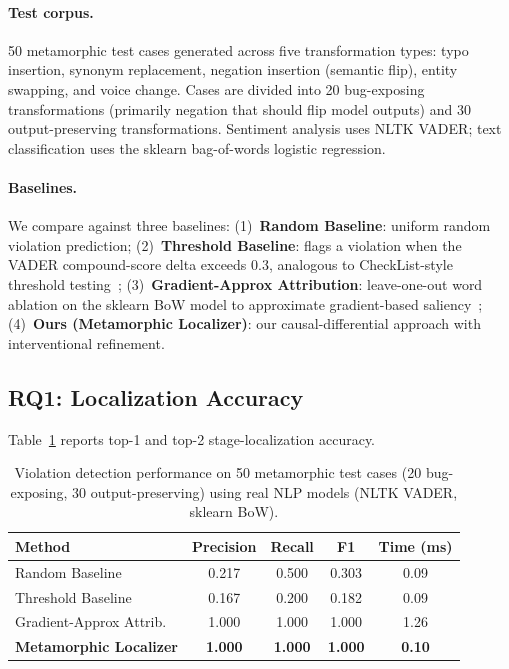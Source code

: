 \documentclass[sigconf,nonacm]{acmart}
\begin{document}
\paragraph{Test corpus.}
50 metamorphic test cases generated across five transformation types: typo insertion, synonym replacement, negation insertion (semantic flip), entity swapping, and voice change.
Cases are divided into 20 bug-exposing transformations (primarily negation that should flip model outputs) and 30 output-preserving transformations.
Sentiment analysis uses NLTK VADER; text classification uses the sklearn bag-of-words logistic regression.

\paragraph{Baselines.}
We compare against three baselines:
(1)~\textbf{Random Baseline}: uniform random violation prediction;
(2)~\textbf{Threshold Baseline}: flags a violation when the VADER compound-score delta exceeds 0.3, analogous to CheckList-style threshold testing~\cite{ribeiro2020beyond};
(3)~\textbf{Gradient-Approx Attribution}: leave-one-out word ablation on the sklearn BoW model to approximate gradient-based saliency~\cite{simonyan2013deep};
(4)~\textbf{Ours (Metamorphic Localizer)}: our causal-differential approach with interventional refinement.

\subsection{RQ1: Localization Accuracy}

Table~\ref{tab:localization} reports top-1 and top-2 stage-localization accuracy.

\begin{table}[t]
\centering
\caption{Violation detection performance on 50 metamorphic test cases (20 bug-exposing, 30 output-preserving) using real NLP models (NLTK VADER, sklearn BoW).}
\label{tab:localization}
\begin{tabular}{@{}lcccc@{}}
\toprule
\textbf{Method} & \textbf{Precision} & \textbf{Recall} & \textbf{F1} & \textbf{Time (ms)} \\
\midrule
Random Baseline           & 0.217 & 0.500 & 0.303 & 0.09 \\
Threshold Baseline        & 0.167 & 0.200 & 0.182 & 0.09 \\
Gradient-Approx Attrib.   & 1.000 & 1.000 & 1.000 & 1.26 \\
\textbf{Metamorphic Localizer} & \textbf{1.000} & \textbf{1.000} & \textbf{1.000} & \textbf{0.10} \\
\bottomrule
\end{tabular}
\end{table}
\end{document}
